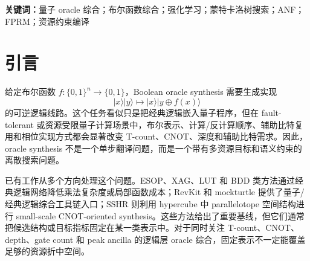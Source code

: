 \documentclass[UTF8,fontset=macnew,11pt]{ctexart}
\newcommand{\anf}{\ensuremath{\mathrm{ANF}}}
\newcommand{\fprm}{\ensuremath{\mathrm{FPRM}}}
\newcommand{\xor}{\ensuremath{\oplus}}
\newcommand{\ttable}{truth table}
\begin{document}
\begin{abstract}
为处理 RevKit \texttt{oracle\_synth} 的 phase/Rz gate-set 边界，本文实现了可验证的 phase-parity \anf{} emitter、fixed-polarity \fprm{} search 和 Affine-FPRM phase search。默认 transform-budget 32 的 Affine-FPRM 在 $T/R_z=30$ proxy 下相对 fixed-polarity FPRM 为 81/0/96、平均 score 降低 2.51\%，相对 RevKit 为 177/0/0、平均降低 65.50\%。进一步把 affine transform budget 扩展到 128 后，selected rows 仍为 531/531 up-to-global-phase 验证通过；在同一 $T/R_z=30$ 目标上相对 budget 32 为 43/0/134，平均 synth-score 再降低 0.60\%，并把 total Rz、CNOT 和 depth 分别降低 2.39\%、1.74\% 和 1.93\%。在 held-out $n=6$ split 上，训练于 $n\leq5$ 的 phase candidate policy 仅 exact-score top-512/8192 个候选即可相对 budget-32 获得 17/0/21、平均 $T/R_z=30$ synth-score 降低 2.47\%，且相对 wide-128 仅高 0.01\%；但同预算 random shortlist 也很接近，因此该结果应解读为可学习剪枝的可行性和候选空间密集性的证据，而非 learned policy 已显著支配 random。正确性方面，本稿主图汇总的 $n=20$--$40$ item-level runs 为 5640/5640，width probe 为 1512/1512，phase selected rows 为 531/531；完整 \ttable{} bridge 在 $n=21$--$30$ 上累计 700/700 方法行通过完整 oracle、plan \anf{} 和 emitted-circuit 符号验证。结果表明，资源约束量子布尔函数综合可以被写成可验证的搜索问题；当前边界是 phase/Rz 分支仍为 parity-gadget 级 proxy，RevKit CLI 仍不是 ROS/SAT garbage-management 或硬件 mapping，官方 ROS 全流程尚未复现，硬件 mapping 不在本文范围内。
\end{abstract}

\noindent\textbf{关键词：}量子 oracle 综合；布尔函数综合；强化学习；蒙特卡洛树搜索；ANF；FPRM；资源约束编译

\section{引言}

给定布尔函数 $f:\{0,1\}^n\rightarrow\{0,1\}$，Boolean oracle synthesis 需要生成实现
\begin{equation}
  |x\rangle |y\rangle \mapsto |x\rangle |y\xor f(x)\rangle
  \label{eq:oracle}
\end{equation}
的可逆逻辑线路。这个任务看似只是把经典逻辑嵌入量子程序，但在 fault-tolerant 或资源受限量子计算场景中，布尔表示、计算/反计算顺序、辅助比特复用和相位实现方式都会显著改变 T-count、CNOT、深度和辅助比特需求。因此，oracle synthesis 不是一个单步翻译问题，而是一个带有多资源目标和语义约束的离散搜索问题。

已有工作从多个方向处理这个问题。ESOP、XAG、LUT 和 BDD 类方法通过经典逻辑网络降低乘法复杂度或局部函数成本\cite{wille2009bdd,meuli2020ros,meuli2022xag}；RevKit 和 mockturtle 提供了量子/经典逻辑综合工具链入口\cite{soeken2018epfl,revkit,mockturtle}；SSHR 则利用 hypercube 中 parallelotope 空间结构进行 small-scale CNOT-oriented synthesis\cite{zheng2025sshr}。这些方法给出了重要基线，但它们通常把候选结构或目标指标固定在某一类表示中。对于同时关注 T-count、CNOT、depth、gate count 和 peak ancilla 的逻辑层 oracle 综合，固定表示不一定能覆盖足够的资源折中空间。
\end{document}
